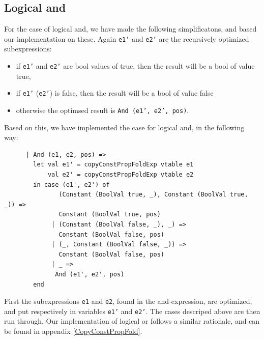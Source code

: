 \documentclass[11pt]{article}
\begin{document}
	\subsection{Logical and}
	For the case of logical and, we have made the following simplificatons, and based our implementation
	on these. Again \texttt{e1'} and \texttt{e2'} are the recursively optimized subexpressions:
	\begin{itemize}
	\item if \texttt{e1'} and \texttt{e2'} are bool values of true, then the result will
		  be a bool of value true,
	\item if \texttt{e1'} (\texttt{e2'}) is false, then the result will be a bool of value false
	\item otherwise the optimsed result is  \texttt{And (e1', e2', pos)}.
	\end{itemize}
	Based on this, we have implemented the case for logical and, in the following way:
	\begin{lstlisting}
      | And (e1, e2, pos) =>
        let val e1' = copyConstPropFoldExp vtable e1
            val e2' = copyConstPropFoldExp vtable e2
        in case (e1', e2') of
               (Constant (BoolVal true, _), Constant (BoolVal true, _)) =>
               Constant (BoolVal true, pos)
             | (Constant (BoolVal false, _), _) =>
               Constant (BoolVal false, pos)
             | (_, Constant (BoolVal false, _)) =>
               Constant (BoolVal false, pos)
             | _ =>
              And (e1', e2', pos)
        end	
	\end{lstlisting}
	First the subexpressions \texttt{e1} and \texttt{e2}, found in the and-expression, are
	optimized, and put respectively in variables \texttt{e1'} and \texttt{e2'}. The cases descriped above
	are then run through. Our implementation of logical or follows a similar rationale, and can be found in
	appendix \ref{CopyConstPropFold}.
\end{document}
